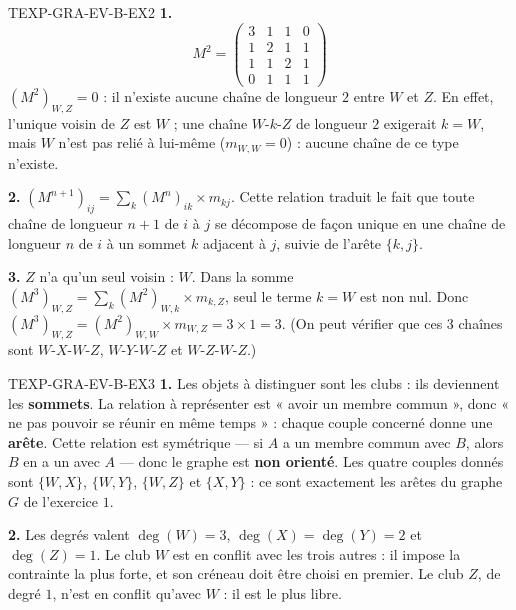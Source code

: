 \begin{corrige}{TEXP-GRA-EV-B-EX2}
\textbf{1.}
$$M^2=\begin{pmatrix}3&1&1&0\\1&2&1&1\\1&1&2&1\\0&1&1&1\end{pmatrix}$$
$(M^2)_{W,Z}=0$ : il n'existe aucune chaîne de longueur $2$ entre $W$ et $Z$. En effet, l'unique voisin de $Z$ est $W$ ; une chaîne $W\text{-}k\text{-}Z$ de longueur $2$ exigerait $k=W$, mais $W$ n'est pas relié à lui-même ($m_{W,W}=0$) : aucune chaîne de ce type n'existe.

\textbf{2.} $(M^{n+1})_{ij}=\displaystyle\sum_{k}(M^n)_{ik}\times m_{kj}$. Cette relation traduit le fait que toute chaîne de longueur $n+1$ de $i$ à $j$ se décompose de façon unique en une chaîne de longueur $n$ de $i$ à un sommet $k$ adjacent à $j$, suivie de l'arête $\{k,j\}$.

\textbf{3.} $Z$ n'a qu'un seul voisin : $W$. Dans la somme $(M^3)_{W,Z}=\sum_k(M^2)_{W,k}\times m_{k,Z}$, seul le terme $k=W$ est non nul. Donc $(M^3)_{W,Z}=(M^2)_{W,W}\times m_{W,Z}=3\times1=3$. (On peut vérifier que ces $3$ chaînes sont $W\text{-}X\text{-}W\text{-}Z$, $W\text{-}Y\text{-}W\text{-}Z$ et $W\text{-}Z\text{-}W\text{-}Z$.)
\end{corrige}

\begin{corrige}{TEXP-GRA-EV-B-EX3}
\textbf{1.} Les objets à distinguer sont les clubs : ils deviennent les \textbf{sommets}. La relation à représenter est « avoir un membre commun », donc « ne pas pouvoir se réunir en même temps » : chaque couple concerné donne une \textbf{arête}. Cette relation est symétrique — si $A$ a un membre commun avec $B$, alors $B$ en a un avec $A$ — donc le graphe est \textbf{non orienté}. Les quatre couples donnés sont $\{W,X\}$, $\{W,Y\}$, $\{W,Z\}$ et $\{X,Y\}$ : ce sont exactement les arêtes du graphe $G$ de l'exercice $1$.

\textbf{2.} Les degrés valent $\deg(W)=3$, $\deg(X)=\deg(Y)=2$ et $\deg(Z)=1$. Le club $W$ est en conflit avec les trois autres : il impose la contrainte la plus forte, et son créneau doit être choisi en premier. Le club $Z$, de degré $1$, n'est en conflit qu'avec $W$ : il est le plus libre.
\end{corrige}
